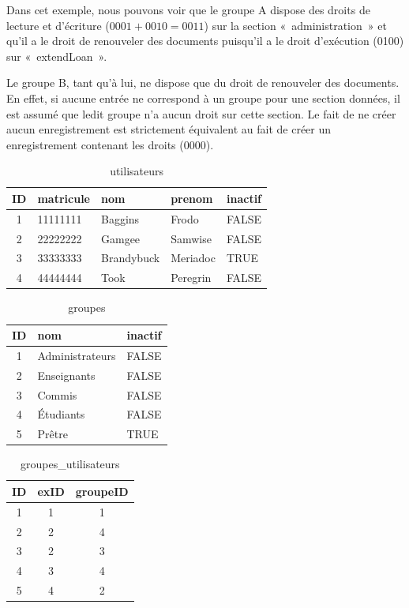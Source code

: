 \documentclass[letter, 11pt]{report}
\begin{document}
Dans cet exemple, nous pouvons voir que le groupe A dispose des droits de lecture et d'écriture ($ 0001 + 0010 = 0011 $) sur la section «~administration~» et qu'il a le droit de renouveler des documents puisqu'il a le droit d'exécution (0100) sur «~extendLoan~».

Le groupe B, tant qu'à lui, ne dispose que du droit de renouveler des documents. En effet, si aucune entrée ne correspond à un groupe pour une section données, il est assumé que ledit groupe n'a aucun droit sur cette section. Le fait de ne créer aucun enregistrement est strictement équivalent au fait de créer un enregistrement contenant les droits (0000).

\begin{table}[h!]
	\caption{utilisateurs}
	\begin{center}
		\begin{tabular}{|c|l|l|l|l|}
			\hline
			ID & matricule & nom         & prenom   & inactif \\
			\hline
			1  & 11111111  & Baggins     & Frodo    & FALSE \\
			2  & 22222222  & Gamgee      & Samwise  & FALSE \\
			3  & 33333333  & Brandybuck  & Meriadoc & TRUE \\
			4  & 44444444  & Took        & Peregrin & FALSE \\
			\hline
		\end{tabular}
	\end{center}
\end{table}

\begin{table}[h!]
	\caption{groupes}
	\begin{center}
		\begin{tabular}{|c|l|l|}
			\hline
			ID & nom               & inactif \\
			\hline
			1  & Administrateurs   & FALSE \\
			2  & Enseignants       & FALSE \\
			3  & Commis            & FALSE \\
			4  & Étudiants         & FALSE \\
			5  & Prêtre            & TRUE \\
			\hline
		\end{tabular}
	\end{center}
\end{table}

\begin{table}[h!]
	\caption{groupes\_utilisateurs}
	\begin{center}
		\begin{tabular}{|c|c|c|}
			\hline
			ID & exID & groupeID \\
			\hline
			1  & 1    & 1 \\
			2  & 2    & 4 \\
			3  & 2    & 3 \\
			4  & 3    & 4 \\
			5  & 4    & 2 \\
			\hline
		\end{tabular}
	\end{center}
\end{table}
\end{document}
